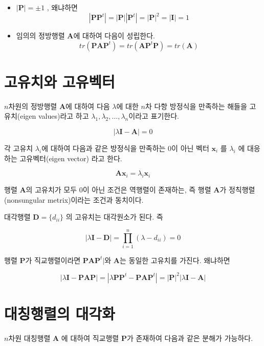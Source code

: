 \documentclass[
  10pt,
]{book}
\theoremstyle{definition}
\theoremstyle{definition}
\theoremstyle{definition}
\theoremstyle{definition}
\theoremstyle{remark}
\begin{document}
\begin{itemize}
\item
  \(| \bm P | = \pm 1\) , 왜냐하면
  \[  | \bm P \bm P^t | = | \bm P | |\bm P^t |  = | \bm P|^2 = |\bm I| =1 \]
\item
  임의의 정방행렬 \(\bm A\)에 대하여 다음이 성립한다.
  \[ tr(\bm P \bm A \bm P^t) = tr(\bm A \bm P^t \bm P) = tr(\bm A) \]
\end{itemize}

\hypertarget{uxace0uxc720uxce58uxc640-uxace0uxc720uxbca1uxd130}{%
\section{고유치와 고유벡터}\label{uxace0uxc720uxce58uxc640-uxace0uxc720uxbca1uxd130}}

\(n\)차원의 정방행렬 \(\bm A\)에 대하여 다음 \(\lambda\)에 대한 \(n\)차 다항 방정식을 만족하는 해들을 고유치(eigen values)라고 하고 \(\lambda_1, \lambda_2, \dots , \lambda_n\)이라고 표기한다.

\[ | \lambda \bm I - \bm A | = 0 \]

각 고유치 \(\lambda_i\)에 대하여 다음과 같은 방정식을 만족하는 0이 아닌 벡터 \(\bm x_i\) 를 \(\lambda_i\) 에 대응하는 고유벡터(eigen vector) 라고 한다.

\[ \bm A \bm x_i = \lambda_i \bm x_i \]

행렬 \(\bm A\)의 고유치가 모두 0이 아닌 조건은 역행렬이 존재하는, 즉 행렬 \(\bm A\)가 정칙행렬(nonsungular metrix)이라는 조건과 동치이다.

대각행렬 \(\bm D = \{ d_{ii} \}\) 의 고유치는 대각원소가 된다. 즉

\[ | \lambda \bm I - \bm D | = \prod_{i=1}^n (\lambda - d_{ii}) =0 \]

행렬 \(\bm P\)가 직교행렬이라면 \(\bm P \bm A \bm P^t|\)와 \(\bm A\)는 동일한 고유치를 가진다. 왜냐하면

\[ | \lambda \bm I - \bm P \bm A \bm P | = |\lambda \bm P \bm P^t - \bm P \bm A \bm P^t| = |\bm P|^2 | \lambda \bm I - \bm A | \]

\hypertarget{uxb300uxce6duxd589uxb82cuxc758-uxb300uxac01uxd654}{%
\section{대칭행렬의 대각화}\label{uxb300uxce6duxd589uxb82cuxc758-uxb300uxac01uxd654}}

\(n\)차원 대칭행렬 \(\bm A\) 에 대하여 직교행렬 \(\bm P\)가 존재하여 다음과 같은 분해가 가능하다.
\end{document}
